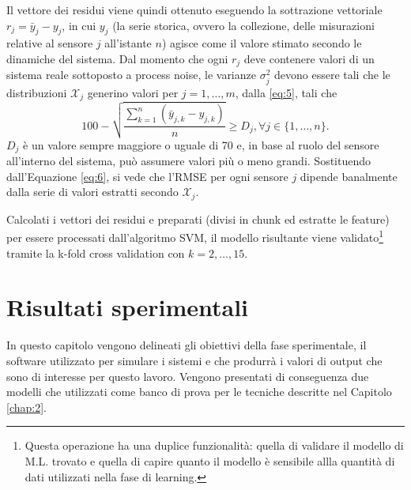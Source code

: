 \documentclass[Lau,binding=0.6cm]{sapthesis}
\begin{document}
Il vettore dei residui viene quindi ottenuto eseguendo la sottrazione vettoriale $r_j = \bar{y}_j - y_j$, in cui $y_j$ (la serie storica, ovvero la collezione, delle misurazioni relative al sensore $j$ all'istante $n$) agisce come il valore stimato secondo le dinamiche del sistema.
Dal momento che ogni $r_j$ deve contenere valori di un sistema reale sottoposto a process noise, le varianze $\sigma_j^2$ devono essere tali che le distribuzioni $\mathcal{X}_j$ generino valori per $j=1,\ldots,m$, dalla \ref{eq:5}, tali che
\begin{equation}
    100 - \sqrt{\frac{\sum_{k=1}^n (\bar{y}_{j,k} - y_{j,k})}{n}} \geq D_j, \forall j\in\{1,\ldots,n\}\label{eq:7}.
\end{equation}
$D_j$ \`e un valore sempre maggiore o uguale di 70 e, in base al ruolo del sensore all'interno del sistema, pu\`o assumere valori pi\`u o meno grandi.
Sostituendo dall'Equazione \ref{eq:6}, si vede che l'RMSE per ogni sensore $j$ dipende banalmente dalla serie di valori estratti secondo $\mathcal{X}_j$.

Calcolati i vettori dei residui e preparati (divisi in chunk ed estratte le feature) per essere processati dall'algoritmo SVM, 
il modello risultante viene validato\footnote{Questa operazione ha una duplice funzionalit\`a: quella di validare il modello di M.L. trovato e quella di capire quanto il modello \`e sensibile allla quantit\`a di dati utilizzati nella fase di learning.}
tramite la k-fold cross validation con $k=2,\ldots,15$.

\chapter{Risultati sperimentali}\label{chap:3}
In questo capitolo vengono delineati gli obiettivi della fase sperimentale, il software utilizzato per simulare i sistemi e che produrr\`a i valori di output 
che sono di interesse per questo lavoro. Vengono presentati di conseguenza due modelli che utilizzati come banco di prova per le tecniche descritte nel Capitolo \ref{chap:2}.
\end{document}
